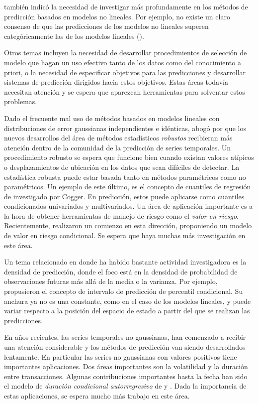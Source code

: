 \documentclass{llncs}
\begin{document}
\cite{Ord1988389} también indicó la necesidad de investigar más profundamente en los métodos de predicción basados en modelos no lineales. Por ejemplo, no existe un claro consenso de que las predicciones de los modelos no lineales superen categóricamente las de los modelos lineales (\cite{Stock19991}). 

Otros temas incluyen la necesidad de desarrollar procedimientos de selección de modelo que hagan un uso efectivo tanto de los datos como del conocimiento a priori, o la necesidad de especificar objetivos para las predicciones y desarrollar sistemas de predicción dirigidos hacia estos objetivos. Estas áreas todavía necesitan atención y se espera que aparezcan herramientas para solventar estos problemas. %

Dado el frecuente mal uso de métodos basados en modelos lineales con distribuciones de error gaussianas independientes e idénticas, \cite{Cogger1988403} abogó por que los nuevos desarrollos del área de métodos estadísticos \emph{robustos} recibieran más atención dentro de la comunidad de la predicción de series temporales. Un procedimiento robusto se espera que funcione bien cuando existan valores atípicos o desplazamientos de ubicación en los datos que sean difíciles de detectar. La estadística robusta puede estar basada tanto en métodos paramétricos como no paramétricos. Un ejemplo de este último, es el concepto de cuantiles de regresión de \cite{Koenker197833} investigado por Cogger. En predicción, estos puede aplicarse como cuantiles condicionados univariados y multivariados. Un área de aplicación importante es a la hora de obtener herramientas de manejo de riesgo como el \emph{valor en riesgo}. Recientemente, \cite{Engle2004367} realizaron un comienzo en esta dirección, proponiendo un modelo de valor en riesgo condicional. Se espera que haya muchas más investigación en este área.

Un tema relacionado en donde ha habido bastante actividad investigadora es la densidad de predicción, donde el foco está en la densidad de probabilidad de observaciones futuras más allá de la media o la varianza. Por ejemplo, \cite{Yao1995395} propusieron el concepto de intervalo de predicción de percentil condicional. Su anchura ya no es una constante, como en el caso de los modelos lineales, y puede variar respecto a la posición del espacio de estado a partir del que se realizan las predicciones.

En años recientes, las series temporales no gaussianas, han comenzado a recibir una atención considerable y los métodos de predicción van siendo desarrollados lentamente. En particular las series no gaussianas con valores positivos tiene importantes aplicaciones. Dos áreas importantes son la volatilidad y la duración entre transacciones. Algunas contribuciones importantes hasta la fecha han sido el modelo de \emph{duración condicional autorregresivo} de \cite{Engle19981127} y  \cite{Andersen2003579}. Dada la importancia de estas aplicaciones, se espera mucho más trabajo en este área.
\end{document}
